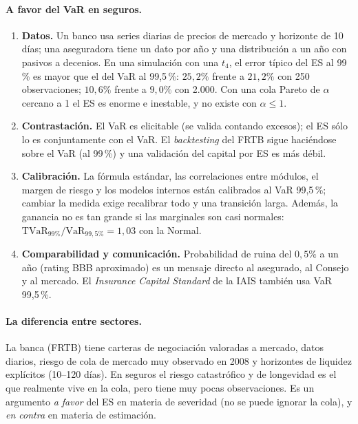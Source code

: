 \documentclass[a4paper,12pt]{article}
\newcommand{\VaR}{\mathrm{VaR}}
\newcommand{\TVaR}{\mathrm{TVaR}}
\begin{document}
\paragraph{A favor del VaR en seguros.}
\begin{enumerate}[leftmargin=*,itemsep=2pt]
\item \textbf{Datos.} Un banco usa series diarias de precios de mercado y horizonte de 10 d\'ias; una aseguradora tiene un dato por a\~no y una distribuci\'on a un a\~no con pasivos a decenios. En una simulaci\'on con una $t_4$, el error t\'ipico del ES al 99\,\% es mayor que el del VaR al 99,5\,\%: $25{,}2\%$ frente a $21{,}2\%$ con 250 observaciones; $10{,}6\%$ frente a $9{,}0\%$ con 2.000. Con una cola Pareto de $\alpha$ cercano a 1 el ES es enorme e inestable, y no existe con $\alpha\le1$.
\item \textbf{Contrastaci\'on.} El VaR es elicitable (se valida contando excesos); el ES s\'olo lo es conjuntamente con el VaR. El \emph{backtesting} del FRTB sigue haci\'endose sobre el VaR (al 99\,\%) y una validaci\'on del capital por ES es m\'as d\'ebil.
\item \textbf{Calibraci\'on.} La f\'ormula est\'andar, las correlaciones entre m\'odulos, el margen de riesgo y los modelos internos est\'an calibrados al VaR 99,5\,\%; cambiar la medida exige recalibrar todo y una transici\'on larga. Adem\'as, la ganancia no es tan grande si las marginales son casi normales: $\TVaR_{99\%}/\VaR_{99,5\%}=1{,}03$ con la Normal.
\item \textbf{Comparabilidad y comunicaci\'on.} Probabilidad de ruina del $0{,}5\%$ a un a\~no (rating BBB aproximado) es un mensaje directo al asegurado, al Consejo y al mercado. El \emph{Insurance Capital Standard} de la IAIS tambi\'en usa VaR 99,5\,\%.
\end{enumerate}

\paragraph{La diferencia entre sectores.} La banca (FRTB) tiene carteras de negociaci\'on valoradas a mercado, datos diarios, riesgo de cola de mercado muy observado en 2008 y horizontes de liquidez expl\'icitos (10--120 d\'ias). En seguros el riesgo catastr\'ofico y de longevidad es el que realmente vive en la cola, pero tiene muy pocas observaciones. Es un argumento \emph{a favor} del ES en materia de severidad (no se puede ignorar la cola), y \emph{en contra} en materia de estimaci\'on.
\end{document}
